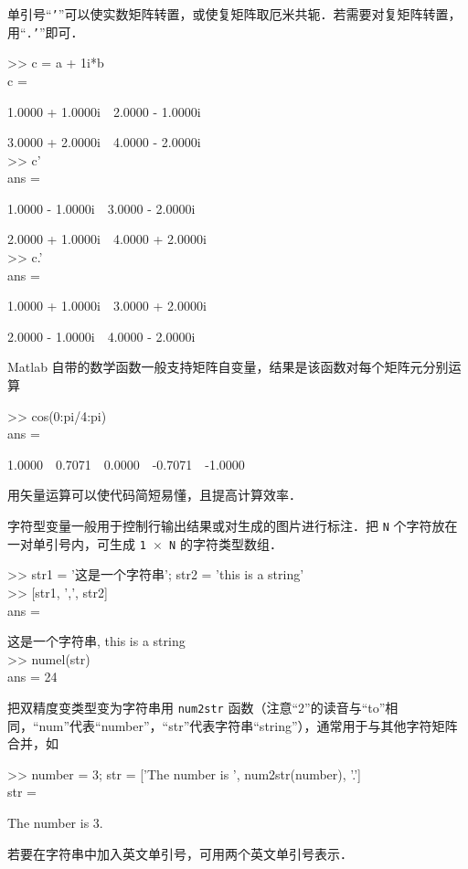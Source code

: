 单引号“\texttt{'}”可以使实数矩阵转置，或使复矩阵取厄米共轭．若需要对复矩阵转置，用“\texttt{.'}”即可．
\begin{Command}
>> c = a + 1i*b \\
c = \par
1.0000 + 1.0000i\ \ 2.0000 - 1.0000i \par
3.0000 + 2.0000i\ \ 4.0000 - 2.0000i \\
>> c' \\
ans = \par
1.0000 - 1.0000i\ \ 3.0000 - 2.0000i \par
2.0000 + 1.0000i\ \ 4.0000 + 2.0000i \\
>> c.' \\
ans = \par
1.0000 + 1.0000i\ \ 3.0000 + 2.0000i \par
2.0000 - 1.0000i\ \ 4.0000 - 2.0000i
\end{Command}
Matlab 自带的数学函数一般支持矩阵自变量，结果是该函数对每个矩阵元分别运算
\begin{Command}
>> cos(0:pi/4:pi)\\
ans = \par
1.0000\ \ 0.7071\ \ 0.0000\ \ -0.7071\ \ -1.0000
\end{Command}
用矢量运算可以使代码简短易懂，且提高计算效率．

字符型变量一般用于控制行输出结果或对生成的图片进行标注．把 \texttt{N} 个字符放在一对单引号内，可生成 \texttt{1 $\times$ N} 的字符类型数组．
\begin{Command}
>> str1 = '\!这是一个字符串'; str2 = 'this is a string' \\
>> [str1, ',', str2] \\
ans = \par
这是一个字符串, this is a string \\
>> numel(str) \\
ans = 24
\end{Command}
把双精度变类型变为字符串用 \texttt{num2str} 函数（注意“2”的读音与“to”相同，“num”代表“number”，“str”代表字符串“string”），通常用于与其他字符矩阵合并，如
\begin{Command}
>> number = 3; str = ['The number is ', num2str(number), '.'] \\
str = \par
The number is 3.
\end{Command}
若要在字符串中加入英文单引号，可用两个英文单引号表示．

